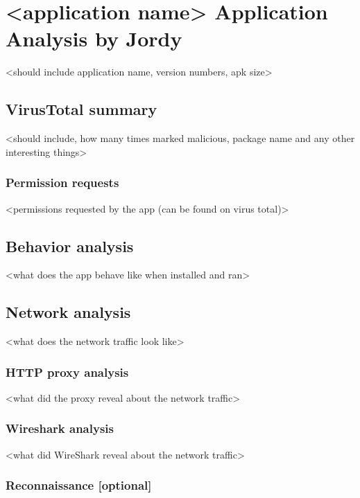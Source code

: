 \section{<application name> Application Analysis by Jordy}

<should include application name, version numbers, apk size>

\newpage
\subsection{VirusTotal summary}

<should include, how many times marked malicious, package name and any other interesting things>

\subsubsection{Permission requests}

<permissions requested by the app (can be found on virus total)>

\newpage
\subsection{Behavior analysis}

<what does the app behave like when installed and ran>

\newpage
\subsection{Network analysis}

<what does the network traffic look like>

\subsubsection{HTTP proxy analysis}

<what did the proxy reveal about the network traffic>

\subsubsection{Wireshark analysis}

<what did WireShark reveal about the network traffic>

\subsubsection{Reconnaissance [optional]}

